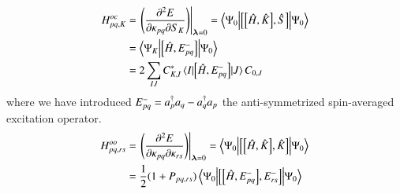 \documentclass[aps,prb,reprint,showkeys,superscriptaddress]{revtex4-1}
\begin{document}
\begin{align}
  \label{eq:CASSCF_OrbCI_Hessian}
  H^{oc}_{pq,K} &= \eval{\mleft(\pdv{E}{\kappa_{pq}}{S_{K}}\mright)}_{\bm{\lambda}=0} = \mel**{\Psi_0}{\com{\com{\hH}{\hK}}{\hS}}{\Psi_0} \\
                &= \mel**{\Psi_K}{\com{\hH}{E_{pq}^-}}{\Psi_0} \notag \\
                &= 2\sum_{IJ}C_{K,I}^*\mel{I}{\com{\hH}{E_{pq}^-}}{J}C_{0,J} \notag
\end{align}
where we have introduced $E_{pq}^- = a_{p}^\dagger a_{q} - a_{q}^\dagger a_{p}$ the anti-symmetrized spin-averaged excitation operator.
\begin{align}
  \label{eq:MCSCF_SO_OrbOrb_Hessian}
  H^{oo}_{pq,rs} &= \eval{\mleft(\pdv{E}{\kappa_{pq}}{\kappa_{rs}}\mright)}_{\bm{\lambda}=0} = \mel**{\Psi_0}{\com{\com{\hH}{\hK}}{\hK}}{\Psi_0} \\
                   &= \frac{1}{2}(1+P_{pq,rs})\mel**{\Psi_0}{\com{\com{\hH}{E_{pq}^-}}{E_{rs}^-}}{\Psi_0} \notag
\end{align}


\end{document}
